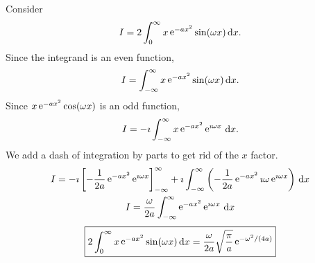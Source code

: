 {\begin{Solution}
  Consider
  \[
  I = 2 \int_0^\infty x \mathop{\mathrm{e}}\nolimits^{-a x^2} \sin(\omega x)\,\mathrm{d} x.
  \]
  Since the integrand is an even function,
  \[
  I = \int_{-\infty}^\infty x \mathop{\mathrm{e}}\nolimits^{-a x^2} \sin(\omega x)\,\mathrm{d} x.
  \]
  Since $x \mathop{\mathrm{e}}\nolimits^{-a x^2} \cos(\omega x)$ is an odd function,
  \[
  I = - \imath \int_{-\infty}^\infty x \mathop{\mathrm{e}}\nolimits^{-a x^2} \mathop{\mathrm{e}}\nolimits^{\imath \omega x} \,\mathrm{d} x.
  \]
  We add a dash of integration by parts to get rid of the $x$ factor.
  \begin{gather*}
    I = - \imath \left[ - \frac{1}{2 a} \mathop{\mathrm{e}}\nolimits^{-a x^2} \mathop{\mathrm{e}}\nolimits^{\imath \omega x} \right]_{-\infty}^\infty
    + \imath \int_{-\infty}^\infty \left( - \frac{1}{2 a} \mathop{\mathrm{e}}\nolimits^{-a x^2} 
      \imath \omega \mathop{\mathrm{e}}\nolimits^{\imath \omega x} \right) \,\mathrm{d} x
    \\
    I = \frac{\omega}{2 a} \int_{-\infty}^\infty \mathop{\mathrm{e}}\nolimits^{-a x^2} \mathop{\mathrm{e}}\nolimits^{\imath \omega x} \,\mathrm{d} x
  \end{gather*}
  \[
  \boxed{
    2 \int_0^\infty x \mathop{\mathrm{e}}\nolimits^{-a x^2} \sin(\omega x)\,\mathrm{d} x
    = \frac{\omega}{2 a} \sqrt{ \frac{\pi}{a} } \mathop{\mathrm{e}}\nolimits^{- \omega^2 / (4 a)}
    }
  \]
\end{Solution}







}
